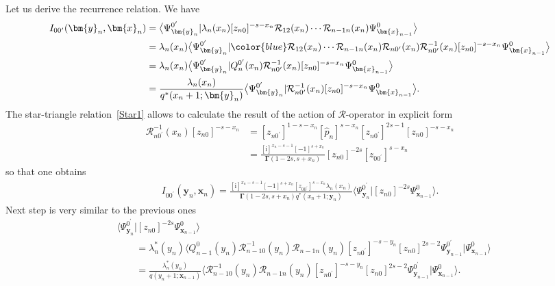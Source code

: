 \documentclass[10pt,a4paper]{amsart}
\newcommand{\blue}{\color{blue}}
\renewcommand{\imath}{\mathrm{i}}
\numberwithin{equation}{section}
\begin{document}
Let us derive the recurrence relation. We have
\begin{align*}
I_{0 0^{\prime}}(\bm{y}_n,\bm{x}_{n}) & =
\bigl\langle\Psi^{0^{\prime}}_{\bm{y}_n}|
\lambda_n(x_n) [z_{n0}]^{-s-x_n} \mathcal{R}_{12}(x_n)\cdots\mathcal{R}_{n-1 n}(x_n)
\Psi^{0}_{\bm{x}_{n-1}}\bigr\rangle \\
& =
\lambda_n(x_n) \bigl\langle\Psi^{0^{\prime}}_{\bm{y}_n}|
{\blue \mathcal{R}_{12}(x_n)\cdots\mathcal{R}_{n-1 n}(x_n)
\mathcal{R}_{n 0^{\prime}}(x_n)}
\mathcal{R}^{-1}_{n 0^{\prime}}(x_n) [z_{n0}]^{-s-x_n}
\Psi^{0}_{\bm{x}_{n-1}}\bigr\rangle \\
& =
\lambda_n(x_n) \bigl\langle\Psi^{0^{\prime}}_{\bm{y}_n}|
Q^{0^{\prime}}_{n}(x_n)
\mathcal{R}^{-1}_{n 0^{\prime}}(x_n) [z_{n0}]^{-s-x_n}
\Psi^{0}_{\bm{x}_{n-1}}\bigr\rangle \\
& =
\frac{\lambda_n(x_n) }{q^{*}(x_n+1;\bm{y}_n)}
\bigl\langle\Psi^{0^{\prime}}_{\bm{y}_n}|
\mathcal{R}^{-1}_{n 0^{\prime}}(x_n) [z_{n0}]^{-s-x_n}
\Psi^{0}_{\bm{x}_{n-1}}\bigr\rangle .
\end{align*}
The star-triangle relation~\eqref{Star1} allows to
calculate the result of the action of $\mathcal{R}$-operator
in explicit form
\begin{align*}
\mathcal{R}^{-1}_{n 0^{\prime}}(x_n) [z_{n0}]^{-s-x_n} & =
[z_{n0^{\prime}}]^{1-s-x_n} [\hat{p}_n]^{s-x_n}
[z_{n0^{\prime}}]^{2s-1} [z_{n0}]^{-s-x_n} \\
& =
\frac{[\imath]^{x_n-s-1} [-1]^{s+x_n}}
{\mathbf{\Gamma}(1-2s,s+x_n)} [z_{n0}]^{-2s}
[z_{0 0^{\prime}}]^{s-x_n}
\end{align*}
so that one obtains
\begin{align*}
I_{0 0^{\prime}}(\bm{y}_n,\bm{x}_{n}) =
\frac{[\imath]^{x_n-s-1} [-1]^{s+x_n} [z_{0 0^{\prime}}]^{s-x_n} \lambda_n(x_n)}
{\mathbf{\Gamma}(1-2s,s+x_n) q^{*}(x_n+1;\bm{y}_n)}
\bigl\langle\Psi^{0^{\prime}}_{\bm{y}_n}| [z_{n0}]^{-2s}
\Psi^{0}_{\bm{x}_{n-1}}\bigr\rangle .
\end{align*}
Next step is very similar to the previous ones
\begin{align*}
&
\bigl\langle\Psi^{0^{\prime}}_{\bm{y}_n}| [z_{n0}]^{-2s}
\Psi^{0}_{\bm{x}_{n-1}}\bigr\rangle \\
& \qquad =
\lambda_n^\ast(y_n) \bigl\langle Q^{0}_{n-1}(y_n)
\mathcal{R}^{-1}_{n-1 0}(y_n)
\mathcal{R}_{n-1 n}(y_n)
[z_{n 0^{\prime}}]^{-s-y_n} [z_{n0}]^{2s-2}
\Psi^{0^{\prime}}_{\bm{y}_{n-1}}| \Psi^{0}_{\bm{x}_{n-1}}\bigr\rangle \\
& \qquad =
\frac{\lambda_n^\ast(y_n)}{q(y_n+1;\bm{x}_{n-1})} \bigl\langle \mathcal{R}^{-1}_{n-1 0}(y_n)
\mathcal{R}_{n-1 n}(y_n)
[z_{n 0^{\prime}}]^{-s-y_n} [z_{n0}]^{2s-2}
\Psi^{0^{\prime}}_{\bm{y}_{n-1}}| \Psi^{0}_{\bm{x}_{n-1}}\bigr\rangle .
\end{align*}
\end{document}
